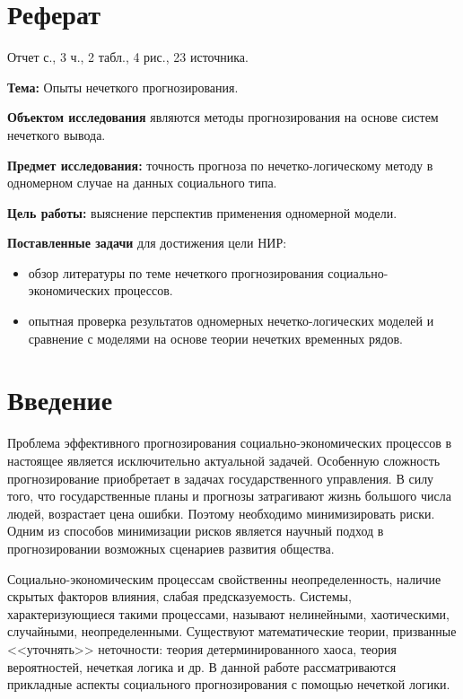 \newpage
\section*{\centering Реферат}
Отчет \pageref{LastPage} с., 3 ч., 2 табл., 4 рис., 23 источника.

\textbf{Тема:} Опыты нечеткого прогнозирования.

\textbf{Объектом исследования} являются методы прогнозирования на основе систем нечеткого вывода.

\textbf{Предмет исследования:} точность прогноза по нечетко-логическому методу в одномерном случае на данных социального типа.

\textbf{Цель работы:} выяснение перспектив применения одномерной модели.

\textbf{Поставленные задачи} для достижения цели НИР:
\begin{itemize}
	\item обзор литературы по теме нечеткого прогнозирования социально-экономических процессов.
	\item опытная проверка результатов одномерных нечетко-логических моделей и сравнение с	моделями на основе теории нечетких временных рядов.
\end{itemize}

\newpage
\section*{Введение}

Проблема эффективного прогнозирования социально-экономических процессов в настоящее является исключительно актуальной задачей. Особенную сложность прогнозирование приобретает в задачах государственного управления. В силу того, что государственные планы и прогнозы затрагивают жизнь большого числа людей, возрастает цена ошибки. Поэтому необходимо минимизировать риски. Одним из способов минимизации рисков является научный подход в прогнозировании возможных сценариев развития общества.  

Социально-экономическим процессам свойственны неопределенность, наличие скрытых факторов влияния, слабая предсказуемость. Системы, характеризующиеся такими процессами, называют нелинейными, хаотическими, случайными, неопределенными. Существуют математические теории, призванные <<уточнять>> неточности: теория детерминированного хаоса, теория вероятностей, нечеткая логика и др. В данной работе рассматриваются прикладные аспекты социального прогнозирования с помощью нечеткой логики.

